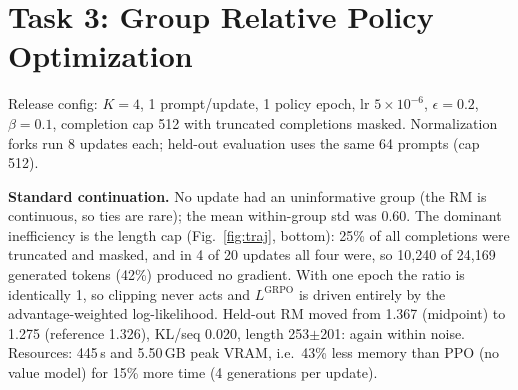 \documentclass{article}
\begin{document}
\section{Task 3: Group Relative Policy Optimization}
\label{sec:grpo}
Release config: $K{=}4$, 1 prompt/update, 1 policy epoch, lr $5{\times}10^{-6}$, $\epsilon{=}0.2$, $\beta{=}0.1$, completion cap 512 with truncated completions masked. Normalization forks run 8 updates each; held-out evaluation uses the same 64 prompts (cap 512).

\textbf{Standard continuation.} No update had an uninformative group (the RM is continuous, so ties are rare); the mean within-group std was 0.60. The dominant inefficiency is the length cap (Fig.~\ref{fig:traj}, bottom): 25\% of all completions were truncated and masked, and in 4 of 20 updates all four were, so 10{,}240 of 24{,}169 generated tokens (42\%) produced no gradient. With one epoch the ratio is identically 1, so clipping never acts and $L^{\text{GRPO}}$ is driven entirely by the advantage-weighted log-likelihood. Held-out RM moved from 1.367 (midpoint) to 1.275 (reference 1.326), KL/seq 0.020, length 253$\pm$201: again within noise. Resources: 445\,s and 5.50\,GB peak VRAM, i.e.\ 43\% less memory than PPO (no value model) for 15\% more time (4 generations per update).

\begin{table}[t]
\centering\footnotesize
\caption{Equal-generation group-size study: 24 cached prompts $\times$ 8 completions = 192 generations regrouped for each $K$, averaged over 200 random partitions. Difficulty bins: terciles of prompt mean reward over all 8 cached completions (hard = lowest). ``Inf.'' = std $>10^{-6}$; ``std$>$0.5'' = fraction with a usable spread; ``Var'' = $\mathbb{E}[(r-\mu_g)^2]$.}
\label{tab:k}
\end{table}
\end{document}
